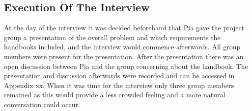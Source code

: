 \subsection{Execution Of The Interview}

At the day of the interview it was decided beforehand that Pia gave the project group a presentation of the overall problem and which requirements the handbooks included, and the interview would commence afterwards. All group members were present for the presentation. After the presentation there was an open discussion between Pia and the group concerning about the handbook. The presentation and discussion afterwards were recorded and can be accessed in Appendix xx. When it was time for the interview only three group members remained as this would provide a less crowded feeling and a more natural conversation could occur.

